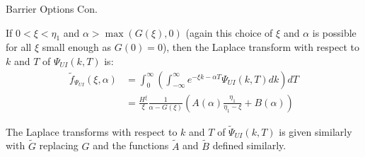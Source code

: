 \documentclass{beamer}
\begin{document}
\begin{frame}{Barrier Options Con.}

    {\footnotesize \footnotesize
    \par  If \(0 < \xi < \eta_1\) and \(\alpha > \max(G(\xi), 0)\) (again this choice of \(\xi\) and \(\alpha\) is possible for 
    all \(\xi\) small enough as \(G(0) = 0\)), then the Laplace transform with respect to \(k\) and \(T\) of \(\Psi_{UI}(k, T)\) is:
     \vspace{1em}
    \begin{align*}
        \tilde{f}_{\Psi_{UI}}(\xi, \alpha) &= \int_0^{\infty} \left( \int_{-\infty}^{\infty} e^{-\xi k - \alpha T} \Psi_{UI}(k, T) dk \right) dT\\
    &= \frac{H^{\xi}}{\xi} \frac{1}{\alpha - G(\xi)} \left( A(\alpha) \frac{\eta_1}{\eta_1 - \xi} + B(\alpha) \right)
    \end{align*}

    \vspace{1em}
    \par The Laplace transforms with respect to \(k\) and \(T\) of \(\tilde{\Psi}_{UI}(k, T)\) is given 
    similarly with \(\tilde{G}\) replacing \(G\) and the functions \(\tilde{A}\) and \(\tilde{B}\) defined similarly. 
    }
\end{frame}
\end{document}
